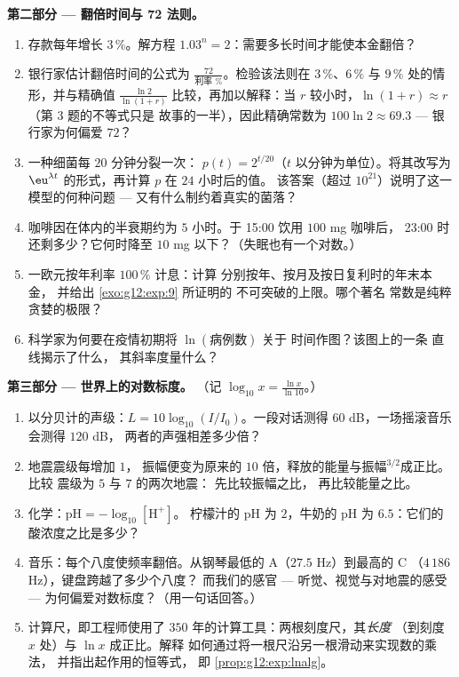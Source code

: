 \begin{problem}
\medskip
\noindent\textbf{第二部分 --- 翻倍时间与
72 法则。}
\begin{enumerate}[resume]
  \item 存款每年增长 $3\,\%$。解方程
        $1.03^n = 2$：需要多长时间才能使本金翻倍？
  \item 银行家估计翻倍时间的公式为
        $\frac{72}{\text{利率 }\%}$。检验该法则在
        $3\,\%$、$6\,\%$ 与 $9\,\%$ 处的情形，并与精确值
        $\frac{\ln 2}{\ln(1 + r)}$ 比较，再加以解释：当
        $r$ 较小时，$\ln(1 + r) \approx r$（第 3 题的不等式只是
        故事的一半），因此精确常数为
        $100 \ln 2 \approx 69.3$ --- 银行家为何偏爱
        $72$？
  \item 一种细菌每 $20$ 分钟分裂一次：
        $p(t) = 2^{t/20}$（$t$ 以分钟为单位）。将其改写为
        $\eu^{\lambda t}$ 的形式，再计算 $p$ 在 $24$ 小时后的值。
        该答案（超过 $10^{21}$）说明了这一模型的何种问题
        --- 又有什么制约着真实的菌落？
  \item 咖啡因在体内的半衰期约为 $5$
        小时。于 15:00 饮用 $100$ mg 咖啡后，
        23:00 时还剩多少？它何时降至
        $10$ mg 以下？（失眠也有一个对数。）
  \item 一欧元按年利率 $100\,\%$ 计息：计算
        分别按年、按月及按日复利时的年末本金，
        并给出 \cref{exo:g12:exp:9} 所证明的
        不可突破的上限。哪个著名
        常数是纯粹贪婪的极限？
  \item 科学家为何要在疫情初期将 $\ln(\text{病例数})$ 关于
        时间作图？该图上的一条
        直线揭示了什么，
        其斜率度量什么？
\end{enumerate}

\medskip
\noindent\textbf{第三部分 --- 世界上的对数标度。}
（记 $\log_{10} x = \frac{\ln x}{\ln 10}$。）
\begin{enumerate}[resume]
  \item 以分贝计的声级：$L = 10 \log_{10}(I/I_0)$。一段对话测得
        $60$ dB，一场摇滚音乐会测得 $120$ dB，
        两者的声强相差多少倍？
  \item 地震震级每增加 $1$，
        振幅便变为原来的 $10$ 倍，释放的能量与振幅$^{3/2}$成正比。比较
        震级为 $5$ 与 $7$ 的两次地震：
        先比较振幅之比，
        再比较能量之比。
  \item 化学：$\text{pH} = -\log_{10}[\mathrm{H^+}]$。
        柠檬汁的 pH 为 $2$，牛奶的 pH 为 $6.5$：它们的
        酸浓度之比是多少？
  \item 音乐：每个八度使频率翻倍。从钢琴最低的
        A（$27.5$ Hz）到最高的 C
        （$4\,186$ Hz），键盘跨越了多少个八度？
        而我们的感官 --- 听觉、视觉与对地震的感受 ---
        为何偏爱对数标度？（用一句话回答。）
  \item 计算尺，即工程师使用了 $350$
        年的计算工具：两根刻度尺，其\emph{长度}
        （到刻度 $x$ 处）与 $\ln x$ 成正比。解释
        如何通过将一根尺沿另一根滑动来实现数的乘法，
        并指出起作用的恒等式，
        即 \cref{prop:g12:exp:lnalg}。
\end{enumerate}


\end{problem}

